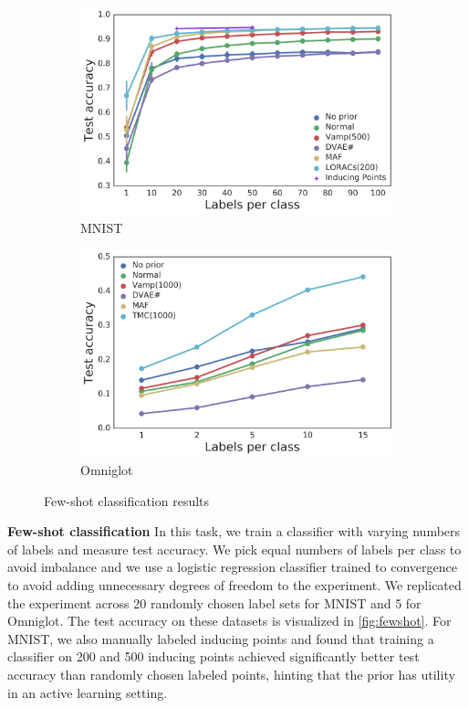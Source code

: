 \begin{figure}[t]
\centering
\begin{subfigure}[t]{0.4\textwidth}
    \centering
    \includegraphics[width=\textwidth]{img/loracs/mnist/cf-mnist.png}
    \caption{MNIST}
\end{subfigure}
\begin{subfigure}[t]{0.4\textwidth}
    \centering
    \includegraphics[width=\textwidth]{img/loracs/omniglot/cf-omniglot.png}
    \caption{Omniglot}
\end{subfigure}
\caption{Few-shot classification results}
\vspace{-0.5cm}
\label{fig:fewshot}
\end{figure}

\textbf{Few-shot classification}
In this task,
we train a
classifier with
varying numbers of labels and measure
test accuracy. We pick
equal numbers of labels per class
to avoid imbalance and we use
a logistic regression classifier
trained to convergence to avoid
adding unnecessary degrees of freedom to the experiment.
We replicated the experiment across
20 randomly chosen label sets for MNIST
and 5 for Omniglot.
The test accuracy on
these datasets is visualized in 
\autoref{fig:fewshot}. For MNIST, we 
also manually labeled inducing points and
found that training a classifier on 200 and 500 inducing points
achieved significantly better test accuracy than 
randomly chosen labeled points, hinting that
the \acronym\;prior has utility in an active learning setting.

